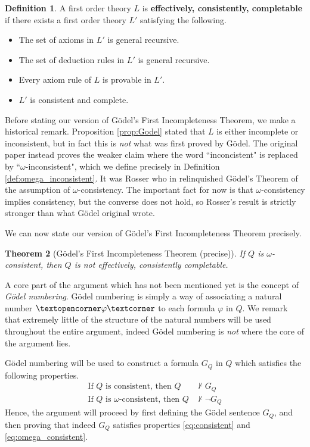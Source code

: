 \documentclass[12pt]{article}
\theoremstyle{plain}
\newtheorem{thm}{Theorem}[subsection] %
\theoremstyle{definition}
\newtheorem{defn}[thm]{Definition} %
\newcommand{\adj}[1]{\text{\textopencorner}{#1}\text{\textcorner}}
\begin{document}
	\begin{defn}
		A first order theory $L$ is \textbf{effectively, consistently, completable} if there exists a first order theory $L'$ satisfying the following.
		\begin{itemize}
			\item The set of axioms in $L'$ is general recursive.
			\item The set of deduction rules in $L'$ is general recursive.
			\item Every axiom rule of $L$ is provable in $L'$.
			\item $L'$ is consistent and complete.
		\end{itemize}
	\end{defn}
	Before stating our version of G\"{o}del's First Incompleteness Theorem, we make a historical remark. Proposition \ref{prop:Godel} stated that $L$ is either incomplete or inconsistent, but in fact this is \emph{not} what was first proved by G\"{o}del. The original paper \cite{Godel} instead proves the weaker claim where the word ``inconcistent" is replaced by ``$\omega$-inconsistent", which we define precisely in Definition \ref{def:omega_inconsistent}. It was Rosser who in \cite{Rosser} relinquished G\"{o}del's Theorem of the assumption of $\omega$-consistency. The important fact for now is that $\omega$-consistency implies consistency, but the converse does not hold, so Rosser's result is strictly stronger than what G\"{o}del original wrote.
	
	We can now state our version of G\"{o}del's First Incompleteness Theorem precisely.
	\begin{thm}[G\"{o}del's First Incompleteness Theorem (precise)]
		If $Q$ is $\omega$-consistent, then $Q$ is not effectively, consistently completable.
	\end{thm}
	
	A core part of the argument which has not been mentioned yet is the concept of \emph{G\"{o}del numbering}. G\"{o}del numbering is simply a way of associating a natural number $\adj{\varphi}$ to each formula $\varphi$ in $Q$. We remark that extremely little of the structure of the natural numbers will be used throughout the entire argument, indeed G\"{o}del numbering is \emph{not} where the core of the argument lies.
	
	G\"{o}del numbering will be used to construct a formula $G_Q$ in $Q$ which satisfies the following properties.
	\begin{align}
		\text{If }Q\text{ is consistent, then }Q &\not\vdash G_Q\label{eq:consistent}\\
		\text{If }Q\text{ is }\omega\text{-consistent, then }Q &\not\vdash \neg G_Q\label{eq:omega_consistent}
	\end{align}
	Hence, the argument will proceed by first defining the G\"{o}del sentence $G_Q$, and then proving that indeed $G_Q$ satisfies properties \eqref{eq:consistent} and \eqref{eq:omega_consistent}.
	
\end{document}
